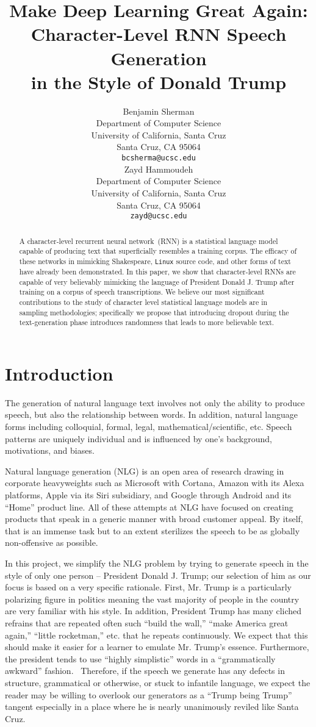 \documentclass{article}
\title{Make Deep Learning Great Again: \\ Character-Level RNN Speech Generation \\ in the Style of Donald Trump}
\author{
  Benjamin Sherman \\
  Department of Computer Science\\
  University of California, Santa Cruz\\
  Santa Cruz, CA 95064 \\
  \texttt{bcsherma@ucsc.edu} \\
  \And
  Zayd Hammoudeh \\
  Department of Computer Science\\
  University of California, Santa Cruz\\
  Santa Cruz, CA 95064 \\
  \texttt{zayd@ucsc.edu} \\
}
\begin{document}
\maketitle

\begin{abstract}
  A character-level recurrent neural network~(RNN) is a statistical language model capable of producing text that superficially resembles a training corpus. The efficacy of these networks in mimicking Shakespeare, \texttt{Linux} source code, and other forms of text have already been demonstrated. In this paper, we show that character-level RNNs are capable of very believably mimicking the language of President Donald J. Trump after training on a corpus of speech transcriptions. We believe our most significant contributions to the study of character level statistical language models are in sampling methodologies; specifically we propose that introducing dropout during the text-generation phase introduces randomness that leads to more believable text.
\end{abstract}

\section{Introduction}

The generation of natural language text involves not only the ability to produce speech, but also the relationship between words.  In addition, natural language forms including colloquial, formal, legal, mathematical/scientific, etc.  Speech patterns are uniquely individual and is influenced by one's background, motivations, and biases.  

Natural language generation (NLG) is an open area of research drawing in corporate heavyweights such as Microsoft with Cortana, Amazon with its Alexa platforms, Apple via its Siri subsidiary, and Google through Android and its ``Home'' product line.  All of these attempts at NLG have focused on creating products that speak in a generic manner with broad customer appeal.  By itself, that is an immense task but to an extent sterilizes the speech to be as globally non-offensive as possible.

In this project, we simplify the NLG problem by trying to generate speech in the style of only one person -- President Donald J. Trump; our selection of him as our focus is based on a very specific rationale.  First, Mr. Trump is a particularly polarizing figure in politics meaning the vast majority of people in the country are very familiar with his style.  In addition, President Trump has many cliched refrains that are repeated often such ``build the wall,'' ``make America great again,'' ``little rocketman,'' etc. that he repeats continuously.  We expect that this should make it easier for a learner to emulate Mr. Trump's essence.  Furthermore, the president tends to use ``highly simplistic'' words in a ``grammatically awkward'' fashion.~\cite{goldhill2017}  Therefore, if the speech we generate has any defects in structure, grammatical or otherwise, or stuck to infantile language, we expect the reader may be willing to overlook our generators as a ``Trump being Trump'' tangent especially in a place where he is nearly unanimously reviled like Santa Cruz.
\end{document}
